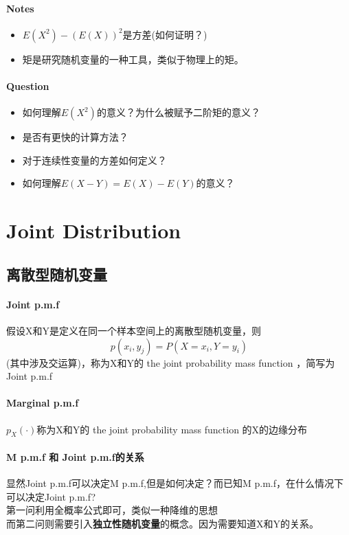 \documentclass[12pt,a4paper]{ctexart}
\begin{document}
\paragraph{Notes}
\begin{itemize}
	\item $ E \left( X^2\right)-\left(E \left(X\right)\right)^2 $是方差(如何证明？)
	\item 矩是研究随机变量的一种工具，类似于物理上的矩。
\end{itemize}
\paragraph{Question}
\begin{itemize}
	\item 如何理解$ E \left(X ^2\right) $的意义？为什么被赋予二阶矩的意义？
	\item 是否有更快的计算方法？
	\item 对于连续性变量的方差如何定义？
	\item 如何理解$ E \left(X-Y\right)= E \left(X\right) -E \left(Y\right) $的意义？
\end{itemize}

\section{Joint Distribution}
\subsection{离散型随机变量}
\paragraph{Joint p.m.f}
假设X和Y是定义在同一个样本空间上的离散型随机变量，则
\[ p \left(x_i,y_j\right) = P \left( X=x_i,Y=y_i\right) \]
(其中涉及交运算)，称为X和Y的 the joint probability mass function ，简写为Joint p.m.f

\paragraph{Marginal p.m.f}
$ p_X \left(\cdot\right) $称为X和Y的 the joint probability mass function 的X的边缘分布

\paragraph{M p.m.f 和 Joint p.m.f的关系}
显然Joint p.m.f可以决定M p.m.f,但是如何决定？而已知M p.m.f，在什么情况下可以决定Joint p.m.f?\\
第一问利用全概率公式即可，类似一种降维的思想\\
而第二问则需要引入\textbf{独立性随机变量}的概念。因为需要知道X和Y的关系。
\end{document}
